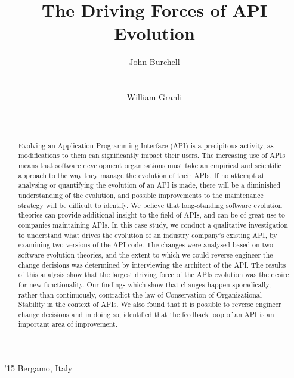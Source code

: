 \documentclass{sig-alternate}
\begin{document}
 {'15 Bergamo, Italy}



\title{The Driving Forces of API Evolution}



\author{
\alignauthor
John Burchell\\
       \\
       \\
\alignauthor
William Granli\\
       \\
       \\
}

\maketitle

\begin{abstract}
Evolving an Application Programming Interface (API) is a precipitous activity, as modifications to them can significantly impact their users. The increasing use of APIs means that software development organisations must take an empirical and scientific approach to the way they manage the evolution of their APIs. 
If no attempt at analysing or quantifying the evolution of an API is made, there will be a diminished understanding of the evolution, and possible improvements to the maintenance strategy will be difficult to identify. We believe that long-standing software evolution theories can provide additional insight to the field of APIs, and can be of great use to companies maintaining APIs. 
In this case study, we conduct a qualitative investigation to understand what drives the evolution of an industry company's existing API, by examining two versions of the API code. The changes were analysed based on two software evolution theories, and the extent to which we could reverse engineer the change decisions was determined by interviewing the architect of the API. 
The results of this analysis show that the largest driving force of the APIs evolution was the desire for new functionality. Our findings which show that changes happen sporadically, rather than continuously, contradict the law of Conservation of Organisational Stability in the context of APIs. We also found that it is possible to reverse engineer change decisions and in doing so, identified that the feedback loop of an API is an important area of improvement. 
\end{abstract}
\end{document}
